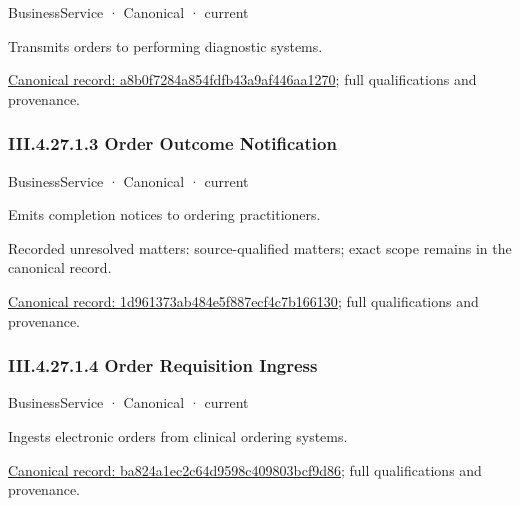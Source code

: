 \label{element:a8b0f7284a854fdfb43a9af446aa1270}
{\small BusinessService · Canonical · current}\par

Transmits orders to performing diagnostic systems.


{\footnotesize \href{../../../../continuum/business/business-service/a8b0f7284a854fdfb43a9af446aa1270.md}{Canonical record: a8b0f7284a854fdfb43a9af446aa1270}; full qualifications and provenance.}\par
\subsubsection*{III.4.27.1.3 Order Outcome Notification}
\label{navigation:III.4.27.1.3}

\label{element:1d961373ab484e5f887ecf4c7b166130}
{\small BusinessService · Canonical · current}\par

Emits completion notices to ordering practitioners.


{\small Recorded unresolved matters: source-qualified matters; exact scope remains in the canonical record.}\par
{\footnotesize \href{../../../../continuum/business/business-service/1d961373ab484e5f887ecf4c7b166130.md}{Canonical record: 1d961373ab484e5f887ecf4c7b166130}; full qualifications and provenance.}\par
\subsubsection*{III.4.27.1.4 Order Requisition Ingress}
\label{navigation:III.4.27.1.4}

\label{element:ba824a1ec2c64d9598c409803bcf9d86}
{\small BusinessService · Canonical · current}\par

Ingests electronic orders from clinical ordering systems.


{\footnotesize \href{../../../../continuum/business/business-service/ba824a1ec2c64d9598c409803bcf9d86.md}{Canonical record: ba824a1ec2c64d9598c409803bcf9d86}; full qualifications and provenance.}\par
